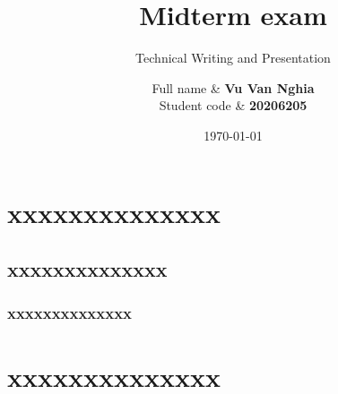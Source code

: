 \documentclass[12pt, twoside]{article}
\title{Midterm exam}
\subtitle{Technical Writing and Presentation}
\author{
    Full name & \textbf{Vu Van Nghia} \\
    Student code &   \textbf{20206205} \\[1cm]
}
\date{\today}
\begin{document}
\maketitlepage
\tableofcontents
\newpage
\section{xxxxxxxxxxxxxx}
\subsection{xxxxxxxxxxxxxx}
\subsubsection{xxxxxxxxxxxxxx}
\section{xxxxxxxxxxxxxx}
\end{document}
